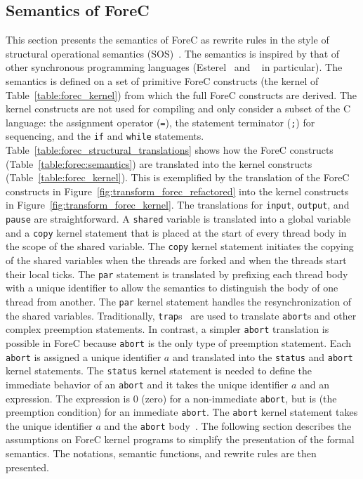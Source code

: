 \subsection{Semantics of ForeC}
\label{sec:forec_semantics}
This section presents the semantics of ForeC as rewrite rules
in the style of structural operational semantics (SOS)~\cite{semantics_sos}. 
The semantics is inspired by that of other synchronous programming
languages (Esterel~\cite{timed_compiling_esterel} and \pretc{}~\cite{pret_pretc} in particular).
The semantics is defined on a set of primitive ForeC constructs
(the kernel of Table~\ref{table:forec_kernel}) from which the full ForeC 
constructs are derived. The kernel constructs are not used for compiling
and only consider a subset of the C language: the assignment operator (\verb$=$), 
the statement terminator (\texttt{;}) for sequencing,
and the \verb$if$ and \verb$while$ statements. 
Table~\ref{table:forec_structural_translations} shows how the
ForeC constructs (Table~\ref{table:forec:semantics}) are translated into the kernel 
constructs (Table~\ref{table:forec_kernel}). This is exemplified by the 
translation of the ForeC constructs in Figure~\ref{fig:transform_forec_refactored} 
into the kernel constructs in Figure~\ref{fig:transform_forec_kernel}. 
The translations for \verb$input$, \verb$output$, and \verb$pause$ are
straightforward. A \verb$shared$ variable is translated into
a global variable and a \verb$copy$ kernel statement that is placed at
the start of every thread body in the scope of the shared variable.
The \verb$copy$ kernel statement initiates the copying of the shared 
variables when the threads are forked and when the threads
start their local ticks.
The \verb$par$ statement is translated by prefixing each
thread body \body{} with a unique identifier \thread{} to 
allow the semantics to distinguish the body of one thread from another. 
The \verb$par$ kernel statement handles the resynchronization of the shared variables.
Traditionally, \verb$trap$s~\cite{timed_compiling_esterel} are used 
to translate \verb$abort$s and other complex preemption statements. 
In contrast, a simpler \verb$abort$ translation is 
possible in ForeC because \verb$abort$ is the only type of preemption statement.
Each \verb$abort$ is assigned a unique identifier $a$ and 
translated into the \verb$status$ and \verb$abort$ kernel
statements. The \verb$status$ kernel statement is needed to
define the immediate behavior of an \verb$abort$ and it takes the
unique identifier $a$ and an expression. The expression is
0 (zero) for a non-immediate \verb$abort$, but is \expression{}
(the preemption condition) for an immediate \verb$abort$. The
\verb$abort$ kernel statement takes the unique
identifier $a$ and the \verb$abort$ body~\body{}. The following section
describes the assumptions on ForeC kernel programs to 
simplify the presentation of the formal semantics. The notations, 
semantic functions, and rewrite rules are then presented.


